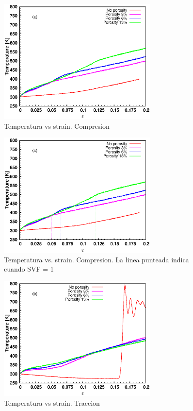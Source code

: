 \documentclass[10pt, oneside]{article} %
\begin{document}

\begin{figure}[H]
\centering
\includegraphics[width=8cm]{Figures/porosity_temp_strain_comp.eps}
\caption{Temperatura vs strain. Compresion}
\end{figure}

\begin{figure}[H]
\centering
\includegraphics[width=8cm]{Figures/porosity_temp_strain_comp_dash.eps}
\caption{Temperatura vs. strain. Compresion. La linea punteada indica cuando SVF = 1}
\end{figure}

\begin{figure}[H]
\centering
\includegraphics[width=8cm]{Figures/porosity_temp_strain_tens.eps}
\caption{Temperatura vs strain. Traccion}
\end{figure}
\end{document}
